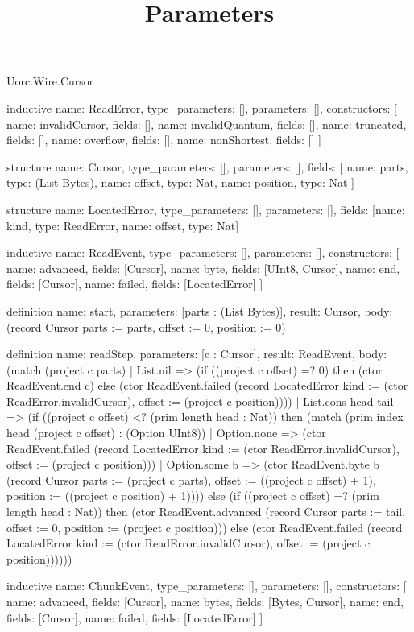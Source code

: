 \begin{lexlean}{Uorc.Wire.Cursor}
\title{Parameters}
\begin{semanticmodule}
inductive{
  name: ReadError,
  type_parameters: [],
  parameters: [],
  constructors: [
    {name: invalidCursor, fields: []},
    {name: invalidQuantum, fields: []},
    {name: truncated, fields: []},
    {name: overflow, fields: []},
    {name: nonShortest, fields: []}
  ]
}

structure{
  name: Cursor,
  type_parameters: [],
  parameters: [],
  fields: [
    {name: parts, type: (List Bytes)},
    {name: offset, type: Nat},
    {name: position, type: Nat}
  ]
}

structure{
  name: LocatedError,
  type_parameters: [],
  parameters: [],
  fields: [{name: kind, type: ReadError}, {name: offset, type: Nat}]
}

inductive{
  name: ReadEvent,
  type_parameters: [],
  parameters: [],
  constructors: [
    {name: advanced, fields: [Cursor]},
    {name: byte, fields: [UInt8, Cursor]},
    {name: end, fields: [Cursor]},
    {name: failed, fields: [LocatedError]}
  ]
}

definition{
  name: start,
  parameters: [parts : (List Bytes)],
  result: Cursor,
  body: (record Cursor {parts := parts, offset := 0, position := 0})
}

definition{
  name: readStep,
  parameters: [c : Cursor],
  result: ReadEvent,
  body: (match (project c parts)
    | List.nil => (if ((project c offset) =? 0) then (ctor ReadEvent.end c) else (ctor ReadEvent.failed (record LocatedError {kind := (ctor ReadError.invalidCursor), offset := (project c position)})))
    | List.cons head tail => (if ((project c offset) <? (prim length head : Nat)) then (match (prim index head (project c offset) : (Option UInt8))
      | Option.none => (ctor ReadEvent.failed (record LocatedError {kind := (ctor ReadError.invalidCursor), offset := (project c position)}))
      | Option.some b => (ctor ReadEvent.byte b (record Cursor {parts := (project c parts), offset := ((project c offset) + 1), position := ((project c position) + 1)}))) else (if ((project c offset) =? (prim length head : Nat)) then (ctor ReadEvent.advanced (record Cursor {parts := tail, offset := 0, position := (project c position)})) else (ctor ReadEvent.failed (record LocatedError {kind := (ctor ReadError.invalidCursor), offset := (project c position)})))))
}

inductive{
  name: ChunkEvent,
  type_parameters: [],
  parameters: [],
  constructors: [
    {name: advanced, fields: [Cursor]},
    {name: bytes, fields: [Bytes, Cursor]},
    {name: end, fields: [Cursor]},
    {name: failed, fields: [LocatedError]}
  ]
}


\end{semanticmodule}
\end{lexlean}
